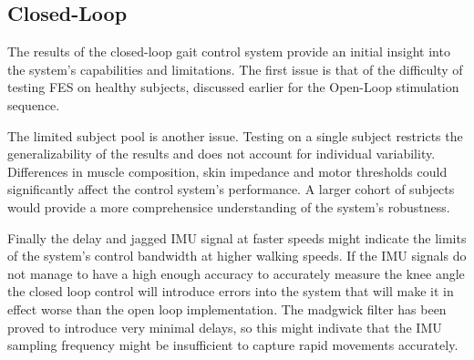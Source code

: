 \subsection{Closed-Loop}

The results of the closed-loop gait control system provide an initial insight into the system's capabilities and limitations. The first issue is that of the difficulty of testing FES on healthy subjects, discussed earlier for the Open-Loop stimulation sequence.

The limited subject pool is another issue. Testing on a single subject restricts the generalizability of the results and does not account for individual variability. Differences in muscle composition, skin impedance and motor thresholds could significantly affect the control system's performance. A larger cohort of subjects would provide a more comprehensice understanding of the system's robustness.

Finally the delay and jagged IMU signal at faster speeds might indicate the limits of the system's control bandwidth at higher walking speeds. If the IMU signals do not manage to have a high enough accuracy to accurately measure the knee angle the closed loop control will introduce errors into the system that will make it in effect worse than the open loop implementation. The madgwick filter has been proved to introduce very minimal delays, so this might indivate that the IMU sampling frequency might be insufficient to capture rapid movements accurately. 



